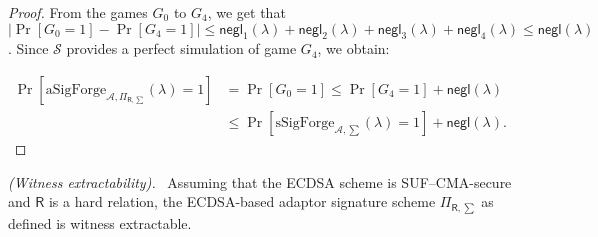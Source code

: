 \documentclass{llncs}
\begin{document}
\begin{proof}
From the games $G_0$ to $G_4$, we get that $|\Pr[G_0 = 1]-\Pr[G_4 = 1]| \leq \mathsf{negl}_1(\lambda) + \mathsf{negl}_2(\lambda) + \mathsf{negl}_3(\lambda) + \mathsf{negl}_4(\lambda)\leq \mathsf{negl}(\lambda)$. Since $\mathcal{S}$ provides a perfect simulation of game $G_4$, we obtain: 

\begin{equation*}
\begin{aligned}
\Pr[\text{aSigForge}_{\mathcal{A},\Pi_{\mathsf{R},\sum}}(\lambda) = 1] &= \Pr[G_0 = 1]\leq \Pr[G_4=1]+\mathsf{negl}(\lambda)\\
&\leq \Pr[\text{sSigForge}_{\mathcal{A},\sum}(\lambda) = 1]+\mathsf{negl}(\lambda).
\end{aligned}
\end{equation*}

\end{proof}


\begin{lemma}
\emph{(Witness extractability).}~\label{Witness Extractability} Assuming that the ECDSA scheme is SUF–CMA-secure and $\mathsf{R}$ is a hard relation, the ECDSA-based adaptor signature scheme $\Pi_{\mathsf{R},\sum}$ as defined is witness extractable.
\end{lemma}
\end{document}

